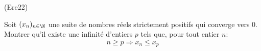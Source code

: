 \begin{tiny}(Ere22)\end{tiny} Soit $(x_{n})_{n\in \N}$ une suite de nombres r{\'e}els strictement positifs qui converge vers 0. Montrer qu'il existe une infinit{\'e} d'entiers $p$ tels que, pour tout entier $n$:
\[n\geq p\Rightarrow x_{n}\leq x_{p} \]